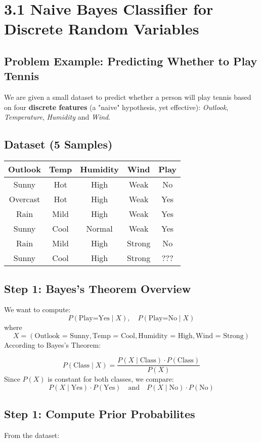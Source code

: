 \documentclass{article}
\begin{document}
\section*{3.1 Naive Bayes Classifier for Discrete Random Variables}
\subsection*{Problem Example: Predicting Whether to Play Tennis}

We are given a small dataset to predict whether a person will play tennis based on four \textbf{discrete features} (a "naive" hypothesis, yet effective): \textit{Outlook}, \textit{Temperature}, \textit{Humidity} and \textit{Wind}.

\subsection*{Dataset (5 Samples)}

\begin{center}
\begin{tabular}{|c|c|c|c|c|}
\hline
Outlook & Temp & Humidity & Wind & Play \\
\hline
Sunny & Hot & High & Weak & No \\
Overcast & Hot & High & Weak & Yes \\
Rain & Mild & High & Weak & Yes \\
Sunny & Cool & Normal & Weak & Yes \\
Rain & Mild & High & Strong & No \\
Sunny & Cool & High & Strong & ??? \\
\hline
\end{tabular}
\end{center}

\subsection*{Step 1: Bayes's Theorem Overview}
We want to compute:
$$
P(\text{Play=Yes} \mid X), \quad P(\text{Play=No} \mid X)
$$
where $$X = (\text{Outlook = Sunny}, \text{Temp = Cool}, \text{Humidity = High}, \text{Wind = Strong})$$
According to Bayes's Theorem:

$$
P(\text{Class} \mid X) = \frac{P(X \mid \text{Class}) \cdot P(\text{Class})}{P(X)}
$$
Since $P(X)$ is constant for both classes, we compare:
$$
P(X \mid \text{Yes}) \cdot P(\text{Yes}) \quad \text{and} \quad P(X \mid \text{No}) \cdot P(\text{No})
$$

\subsection*{Step 1: Compute Prior Probabilites}
From the dataset: 
\end{document}
